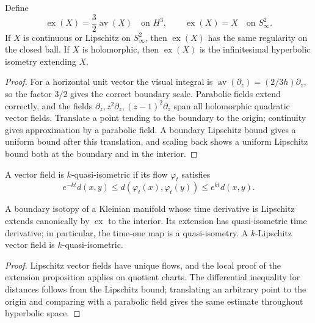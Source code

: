 \begin{proposition}
\label{thurston-ch11-renormalized-extension}

Define
\[
 \operatorname{ex}(X)=\frac32\operatorname{av}(X)\quad\text{on }H^3,
 \qquad \operatorname{ex}(X)=X\quad\text{on }S^2_\infty.
\]
If $X$ is continuous or Lipschitz on $S^2_\infty$, then $\operatorname{ex}(X)$
has the same regularity on the closed ball.  If $X$ is holomorphic, then
$\operatorname{ex}(X)$ is the infinitesimal hyperbolic isometry extending $X$.
\end{proposition}
\begin{proof}
\sketch For a horizontal unit vector the visual integral is
$\operatorname{av}(\partial_z)=(2/3h)\partial_z$, so the factor $3/2$
gives the correct boundary scale.  Parabolic fields extend correctly, and
the fields $\partial_z,z^2\partial_z,(z-1)^2\partial_z$ span all holomorphic
quadratic vector fields.  Translate a point tending to the boundary to the
origin; continuity gives approximation by a parabolic field.  A boundary
Lipschitz bound gives a uniform bound after this translation, and scaling back
shows a uniform Lipschitz bound both at the boundary and in the interior.
\end{proof}

\begin{definition}
\label{thurston-ch11-quasi-isometric-field}

A vector field is $k$-quasi-isometric if its flow $\varphi_t$ satisfies
\[
 e^{-kt}d(x,y)\le d(\varphi_t(x),\varphi_t(y))\le e^{kt}d(x,y).
\]
\end{definition}
\begin{proposition}
\label{thurston-ch11-isotopy-extension}

A boundary isotopy of a Kleinian manifold whose time derivative is Lipschitz
extends canonically by $\operatorname{ex}$ to the interior.  Its extension has
quasi-isometric time derivative; in particular, the time-one map is a
quasi-isometry.  A $k$-Lipschitz vector field is $k$-quasi-isometric.
\end{proposition}
\begin{proof}
\sketch Lipschitz vector fields have unique flows, and the local proof of the
extension proposition applies on quotient charts.  The differential inequality
for distances follows from the Lipschitz bound; translating an arbitrary point
to the origin and comparing with a parabolic field gives the same estimate
throughout hyperbolic space.
\end{proof}

